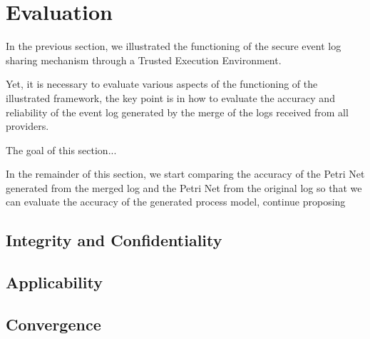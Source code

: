 \section{Evaluation}
\label{sec:evaluation}
In the previous section, we illustrated the functioning of the secure event log sharing mechanism through a Trusted Execution Environment.

Yet, it is necessary to evaluate various aspects of the functioning of the illustrated framework, the key point is in how to evaluate the accuracy and reliability of the event log generated by the merge of the logs received from all providers.

The goal of this section...


In the remainder of this section, we start comparing the accuracy of the Petri Net generated from the merged log and the Petri Net from the original log so that we can evaluate the accuracy of the generated process model, continue proposing



\subsection{Integrity and Confidentiality}



\subsection{Applicability}




\subsection{Convergence}
